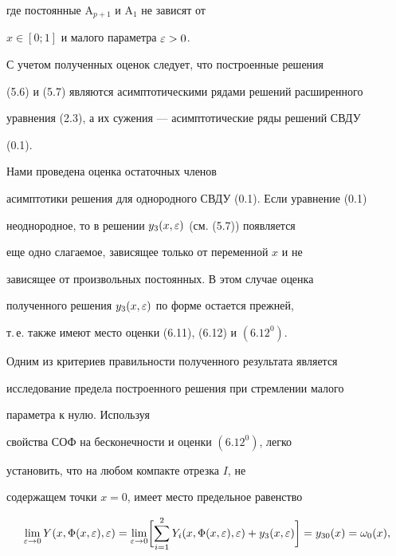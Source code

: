 где постоянные $\mathrm{A}_{p +1}$ и $\mathrm{A}_1$ не зависят от


$x \in [0;1]$ и малого параметра $\varepsilon >0$.





С учетом полученных оценок следует, что построенные решения


(5.6) и (5.7) являются асимптотическими рядами решений расширенного


уравнения (2.3), а их сужения --- асимптотические ряды решений СВДУ


(0.1).





\begin{note}


Нами проведена оценка остаточных членов


асимптотики решения для однородного СВДУ (0.1). Если уравнение (0.1)


неоднородное, то в решении $ y_3 (x, \varepsilon)$ (см. (5.7)) появляется


еще одно слагаемое, зависящее только от переменной $x$ и не


зависящее от произвольных постоянных. В этом случае оценка


полученного решения $ y_3 (x, \varepsilon)$ по форме остается прежней,


т.\,е. также имеют место оценки (6.11), (6.12) и $(6.12^0)$.


\end{note}





Одним из критериев правильности полученного результата является


исследование предела построенного решения при стремлении малого


параметра к нулю. Используя


свойства СОФ на бесконечности и оценки $(6.12^0)$, легко


установить, что на любом компакте отрезка $I$, не


содержащем точки $x = 0$, имеет место предельное равенство


\begin{equation}


\lim_{\e \to 0} Y(x, \Phi(x, \e), \e) = \lim_{\e \to 0} \biggl[


\sum \limits_{i=1}^2 Y_i (x, \Phi(x, \e), \e) + y_3 (x, \e) \biggr]


= y_{30} (x) = \o_0 (x), 


\end{equation}


